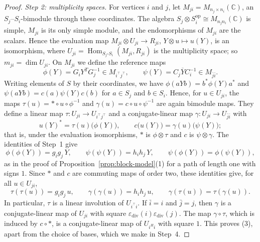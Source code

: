 \documentclass[12pt, a4paper]{report}
\theoremstyle{plain}
\theoremstyle{definition}
\theoremstyle{remark}
\theoremstyle{plain}
\newcommand{\epsilondiv}{\varepsilon_{\mathrm{div}}}
\newcommand{\CC}{\mathbb{C}}
\DeclareMathOperator{\Hom}{Hom}
\begin{document}
\begin{proof}
\emph{Step 2: multiplicity spaces.} For vertices $i$ and $j$, let $M_{ji}=M_{n_j\times n_i}(\CC)$, an $S_j$--$S_i$-bimodule through these coordinates. The algebra $S_j\otimes S_i^{\mathrm{op}}\cong M_{n_jn_i}(\CC)$ is simple, $M_{ji}$ is its only simple module, and the endomorphisms of $M_{ji}$ are the scalars. Hence the evaluation map $M_{ji}\otimes U_{ji}\to R_{ji}$, $Y\otimes u\mapsto u(Y)$, is an isomorphism, where $U_{ji}=\Hom_{S_j\text{-}S_i}(M_{ji},R_{ji})$ is the multiplicity space; so $m_{ji}=\dim U_{ji}$. On $M_{ji}$ we define the reference maps
\[ \phi(Y)=G_iY^TG_j^{-1}\in M_{i^{\top}j^{\top}},\qquad \psi(Y)=C_j\overline YC_i^{-1}\in M_{\bar j\bar i}. \]
Writing elements of $S$ by their coordinates, we have $\phi(aYb)=b^*\phi(Y)a^*$ and $\psi(aYb)=c(a)\psi(Y)c(b)$ for $a\in S_j$ and $b\in S_i$. Hence, for $u\in U_{ji}$, the maps $\tau(u)=*\circ u\circ\phi^{-1}$ and $\gamma(u)=c\circ u\circ\psi^{-1}$ are again bimodule maps. They define a linear map $\tau:U_{ji}\to U_{i^{\top}j^{\top}}$ and a conjugate-linear map $\gamma:U_{ji}\to U_{\bar j\bar i}$ with
\[ u(Y)^*=\tau(u)\bigl(\phi(Y)\bigr),\qquad c\bigl(u(Y)\bigr)=\gamma(u)\bigl(\psi(Y)\bigr); \]
that is, under the evaluation isomorphisms, $*$ is $\phi\otimes\tau$ and $c$ is $\psi\otimes\gamma$. The identities of Step~1 give
\[ \phi(\phi(Y))=g_ig_j\,Y,\qquad \psi(\psi(Y))=h_ih_j\,Y,\qquad \psi(\phi(Y))=\phi(\psi(Y)), \]
as in the proof of Proposition~\ref{prop:block-model}(1) for a path of length one with signs $1$. Since $*$ and $c$ are commuting maps of order two, these identities give, for all $u\in U_{ji}$,
\begin{equation*}
\tau(\tau(u))=g_ig_j\,u,\qquad \gamma(\gamma(u))=h_ih_j\,u,\qquad \gamma(\tau(u))=\tau(\gamma(u)).\tag{R}
\end{equation*}
In particular, $\tau$ is a linear involution of $U_{i^{\top}i}$. If $\bar i=i$ and $\bar j=j$, then $\gamma$ is a conjugate-linear map of $U_{ji}$ with square $\epsilondiv(i)\epsilondiv(j)$. The map $\gamma\circ\tau$, which is induced by $c\circ*$, is a conjugate-linear map of $U_{i^Hi}$ with square $1$. This proves (3), apart from the choice of bases, which we make in Step~4.


\end{proof}
\end{document}
